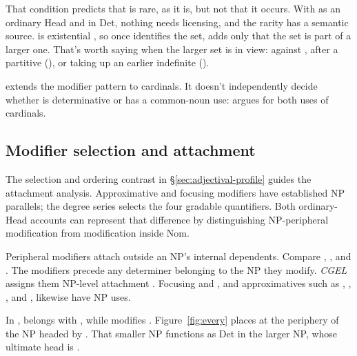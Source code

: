 \documentclass[12pt]{article}
\begin{document}
That condition predicts that  is rare, as it is, but not that it occurs. With  as an ordinary Head and  in Det, nothing needs licensing, and the rarity has a semantic source.  is existential \citep[380]{huddleston2002}, so once  identifies the set,  adds only that the set is part of a larger one. That's worth saying when the larger set is in view: against , after a partitive (), or taking up an earlier indefinite ().

 extends the modifier pattern to cardinals. It doesn't independently decide whether  is determinative or has a common-noun use: \textcite{reynolds2026numerals} argues for both uses of cardinals.

\subsection{Modifier selection and attachment}\label{sec:payne}

The selection and ordering contrast in §\ref{sec:adjectival-profile} guides the attachment analysis. Approximative and focusing modifiers have established NP parallels; the degree series selects the four gradable quantifiers. Both ordinary-Head accounts can represent that difference by distinguishing NP-peripheral modification from modification inside Nom.

Peripheral modifiers attach outside an NP's internal dependents. Compare , , and . The modifiers precede any determiner belonging to the NP they modify. \textit{CGEL} assigns them NP-level attachment \citep[430--431]{huddleston2002}. Focusing  and , and approximatives such as , , , and , likewise have NP uses.

In ,  belongs with , while  modifies . Figure~\ref{fig:every} places  at the periphery of the NP headed by . That smaller NP functions as Det in the larger NP, whose ultimate head is .
\end{document}

